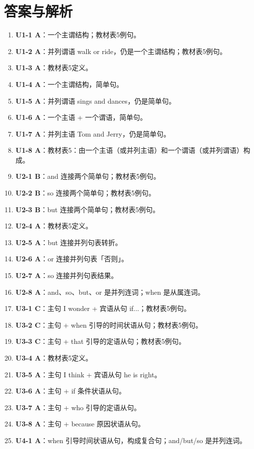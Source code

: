 \documentclass[11pt,a4paper]{ctexart}
\begin{document}
\section*{答案与解析}
\small
\begin{enumerate}[leftmargin=1.6em,itemsep=2pt]
\item \textbf{U1-1 A}：一个主谓结构；教材表5例句。
\item \textbf{U1-2 A}：并列谓语 walk or ride，仍是一个主谓结构；教材表5例句。
\item \textbf{U1-3 A}：教材表5定义。
\item \textbf{U1-4 A}：一个主谓结构，简单句。
\item \textbf{U1-5 A}：并列谓语 sings and dances，仍是简单句。
\item \textbf{U1-6 A}：一个主语 + 一个谓语，简单句。
\item \textbf{U1-7 A}：并列主语 Tom and Jerry，仍是简单句。
\item \textbf{U1-8 A}：教材表5：由一个主语（或并列主语）和一个谓语（或并列谓语）构成。
\item \textbf{U2-1 B}：and 连接两个简单句；教材表5例句。
\item \textbf{U2-2 B}：so 连接两个简单句；教材表5例句。
\item \textbf{U2-3 B}：but 连接两个简单句；教材表5例句。
\item \textbf{U2-4 A}：教材表5定义。
\item \textbf{U2-5 A}：but 连接并列句表转折。
\item \textbf{U2-6 A}：or 连接并列句表「否则」。
\item \textbf{U2-7 A}：so 连接并列句表结果。
\item \textbf{U2-8 A}：and、so、but、or 是并列连词；when 是从属连词。
\item \textbf{U3-1 C}：主句 I wonder + 宾语从句 if...；教材表5例句。
\item \textbf{U3-2 C}：主句 + when 引导的时间状语从句；教材表5例句。
\item \textbf{U3-3 C}：主句 + that 引导的定语从句；教材表5例句。
\item \textbf{U3-4 A}：教材表5定义。
\item \textbf{U3-5 A}：主句 I think + 宾语从句 he is right。
\item \textbf{U3-6 A}：主句 + if 条件状语从句。
\item \textbf{U3-7 A}：主句 + who 引导的定语从句。
\item \textbf{U3-8 A}：主句 + because 原因状语从句。
\item \textbf{U4-1 A}：when 引导时间状语从句，构成复合句；and/but/so 是并列连词。

\end{enumerate}
\end{document}
